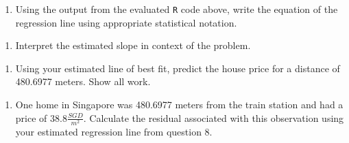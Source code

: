 \documentclass[
]{report}
\newenvironment{Shaded}{\begin{snugshade}}{\end{snugshade}}
\newcommand{\AttributeTok}[1]{\textcolor[rgb]{0.77,0.63,0.00}{#1}}
\newcommand{\CommentTok}[1]{\textcolor[rgb]{0.56,0.35,0.01}{\textit{#1}}}
\newcommand{\DecValTok}[1]{\textcolor[rgb]{0.00,0.00,0.81}{#1}}
\newcommand{\FunctionTok}[1]{\textcolor[rgb]{0.00,0.00,0.00}{#1}}
\newcommand{\NormalTok}[1]{#1}
\newcommand{\OtherTok}[1]{\textcolor[rgb]{0.56,0.35,0.01}{#1}}
\newcommand{\SpecialCharTok}[1]{\textcolor[rgb]{0.00,0.00,0.00}{#1}}
\providecommand{\tightlist}{%
  \setlength{\itemsep}{0pt}\setlength{\parskip}{0pt}}
\begin{document}
\begin{Shaded}
\end{Shaded}

\begin{enumerate}
\def\labelenumi{\arabic{enumi}.}
\setcounter{enumi}{6}
\tightlist
\item
  Using the output from the evaluated \texttt{R} code above, write the equation of the regression line using appropriate statistical notation.
\end{enumerate}

\vspace{1in}

\begin{enumerate}
\def\labelenumi{\arabic{enumi}.}
\setcounter{enumi}{7}
\tightlist
\item
  Interpret the estimated slope in context of the problem.
\end{enumerate}

\vspace{1in}

\begin{enumerate}
\def\labelenumi{\arabic{enumi}.}
\setcounter{enumi}{8}
\tightlist
\item
  Using your estimated line of best fit, predict the house price for a distance of 480.6977 meters. Show all work.
\end{enumerate}

\vspace{1in}

\begin{enumerate}
\def\labelenumi{\arabic{enumi}.}
\setcounter{enumi}{9}
\tightlist
\item
  One home in Singapore was 480.6977 meters from the train station and had a price of \(38.8 \frac{SGD}{m^2}\). Calculate the residual associated with this observation using your estimated regression line from question 8.
\end{enumerate}

\vspace{1in}
\end{document}
